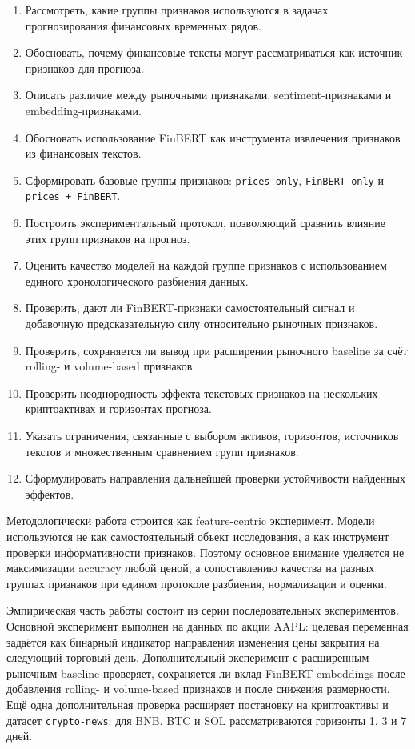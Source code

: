 \begin{enumerate}
    \item Рассмотреть, какие группы признаков используются в задачах прогнозирования финансовых временных рядов.
    \item Обосновать, почему финансовые тексты могут рассматриваться как источник признаков для прогноза.
    \item Описать различие между рыночными признаками, sentiment-признаками и embedding-признаками.
    \item Обосновать использование FinBERT как инструмента извлечения признаков из финансовых текстов.
    \item Сформировать базовые группы признаков: \texttt{prices-only}, \texttt{FinBERT-only} и \texttt{prices + FinBERT}.
    \item Построить экспериментальный протокол, позволяющий сравнить влияние этих групп признаков на прогноз.
    \item Оценить качество моделей на каждой группе признаков с использованием единого хронологического разбиения данных.
    \item Проверить, дают ли FinBERT-признаки самостоятельный сигнал и добавочную предсказательную силу относительно рыночных признаков.
    \item Проверить, сохраняется ли вывод при расширении рыночного baseline за счёт rolling- и volume-based признаков.
    \item Проверить неоднородность эффекта текстовых признаков на нескольких криптоактивах и горизонтах прогноза.
    \item Указать ограничения, связанные с выбором активов, горизонтов, источников текстов и множественным сравнением групп признаков.
    \item Сформулировать направления дальнейшей проверки устойчивости найденных эффектов.
\end{enumerate}

Методологически работа строится как feature-centric эксперимент. Модели используются не как самостоятельный объект исследования, а как инструмент проверки информативности признаков. Поэтому основное внимание уделяется не максимизации accuracy любой ценой, а сопоставлению качества на разных группах признаков при едином протоколе разбиения, нормализации и оценки.

Эмпирическая часть работы состоит из серии последовательных экспериментов. Основной эксперимент выполнен на данных по акции AAPL: целевая переменная задаётся как бинарный индикатор направления изменения цены закрытия на следующий торговый день. Дополнительный эксперимент с расширенным рыночным baseline проверяет, сохраняется ли вклад FinBERT embeddings после добавления rolling- и volume-based признаков и после снижения размерности. Ещё одна дополнительная проверка расширяет постановку на криптоактивы и датасет \texttt{crypto-news}: для BNB, BTC и SOL рассматриваются горизонты 1, 3 и 7 дней.


